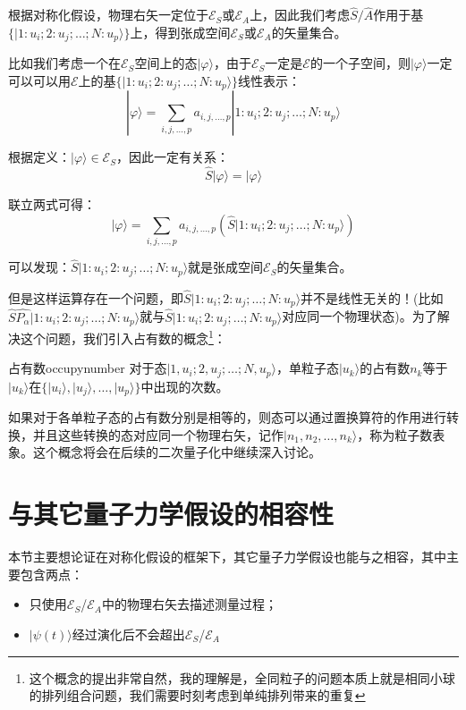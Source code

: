     根据对称化假设，物理右矢一定位于$\mathscr{E}_S$或$\mathscr{E}_A$上，因此我们考虑$\hat{S}/\hat{A}$作用于基$\{|1:u_i;2:u_j;\dots;N:u_p\rangle\}$上，得到张成空间$\mathscr{E}_S$或$\mathscr{E}_A$的矢量集合。
    \begin{remark}
    比如我们考虑一个在$\mathscr{E}_S$空间上的态$|\varphi\rangle$，由于$\mathscr{E}_S$一定是$\mathscr{E}$的一个子空间，则$|\varphi\rangle$一定可以可以用$\mathscr{E}$上的基$\{|1:u_i;2:u_j;\dots;N:u_p\rangle\}$线性表示：
    \begin{equation}
        |\varphi\rangle=\sum_{i,j,\dots,p}a_{i,j,\dots,p}|1:u_i;2:u_j;\dots;N:u_p\rangle
    \end{equation}
    
    根据定义：$|\varphi\rangle\in\mathscr{E}_S$，因此一定有关系：
    \begin{equation}
        \hat{S}|\varphi\rangle=|\varphi\rangle
    \end{equation}
    
    联立两式可得：
    \begin{equation}
         |\varphi\rangle=\sum_{i,j,\dots,p}a_{i,j,\dots,p}(\hat{S}|1:u_i;2:u_j;\dots;N:u_p\rangle)
    \end{equation}
    
    可以发现：$\hat{S}|1:u_i;2:u_j;\dots;N:u_p\rangle$就是张成空间$\mathscr{E}_S$的矢量集合。
    \end{remark}
    
    但是这样运算存在一个问题，即$\hat{S}|1:u_i;2:u_j;\dots;N:u_p\rangle$并不是线性无关的！(比如$\hat{S}\hat{P_\alpha}|1:u_i;2:u_j;\dots;N:u_p\rangle$就与$\hat{S}|1:u_i;2:u_j;\dots;N:u_p\rangle$对应同一个物理状态)。为了解决这个问题，我们引入占有数的概念\footnote{这个概念的提出非常自然，我的理解是，全同粒子的问题本质上就是相同小球的排列组合问题，我们需要时刻考虑到单纯排列带来的重复}：
    \begin{definition}{占有数}{occupynumber}
        对于态$|1,u_i;2,u_j;\dots;N,u_p\rangle$，单粒子态$|u_k\rangle$的占有数$n_k$等于$|u_k\rangle$在$\{|u_i\rangle,|u_j\rangle,\dots,|u_p\rangle\}$中出现的次数。
    \end{definition}
    
    如果对于各单粒子态的占有数分别是相等的，则态可以通过置换算符的作用进行转换，并且这些转换的态对应同一个物理右矢，记作$|n_1,n_2,\dots,n_k\rangle$，称为粒子数表象。这个概念将会在后续的二次量子化中继续深入讨论。

    \section{与其它量子力学假设的相容性}
    本节主要想论证在对称化假设的框架下，其它量子力学假设也能与之相容，其中主要包含两点：
    \begin{itemize}
        \item 只使用$\mathscr{E}_S$/$\mathscr{E}_A$中的物理右矢去描述测量过程；
        \item $|\psi(t)\rangle$经过演化后不会超出$\mathscr{E}_S$/$\mathscr{E}_A$
    \end{itemize}
    
